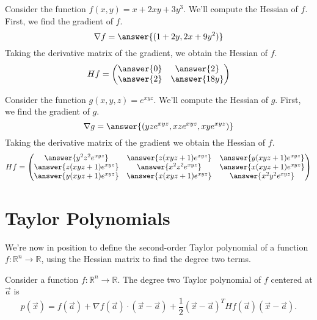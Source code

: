\documentclass{ximera}
\begin{document}
\begin{example}
Consider the function $f(x,y) = x + 2xy + 3y^3$. We'll compute the Hessian of $f$. First, we find the gradient of $f$.
\[
\nabla f = \answer{(1+2y, 2x+9y^2)}
\]
Taking the derivative matrix of the gradient, we obtain the Hessian of $f$.
\[
Hf = \begin{pmatrix}
\answer{0} & \answer{2}\\
\answer{2} & \answer{18y}
\end{pmatrix}
\]

Consider the function $g(x,y,z) = e^{xyz}$. We'll compute the Hessian of $g$. First, we find the gradient of $g$.
\[
\nabla g = \answer{(yze^{xyz}, xze^{xyz}, xye^{xyz})}
\]
Taking the derivative matrix of the gradient we obtain the Hessian of $f$.
\[
Hf = \begin{pmatrix}
\answer{y^2z^2e^{xyz}} & \answer{z(xyz+1)e^{xyz}} & \answer{y(xyz+1)e^{xyz}}\\
\answer{z(xyz+1)e^{xyz}} & \answer{x^2z^2e^{xyz}} & \answer{x(xyz+1)e^{xyz}}\\
\answer{y(xyz+1)e^{xyz}} & \answer{x(xyz+1)e^{xyz}} & \answer{x^2y^2e^{xyz}}
\end{pmatrix}
\]
\end{example}

\section*{Taylor Polynomials}

We're now in position to define the second-order Taylor polynomial of a function $f:\mathbb{R}^n\rightarrow \mathbb{R}$, using the Hessian matrix to find the degree two terms.

\begin{definition}
Consider a function $f:\mathbb{R}^n\rightarrow\mathbb{R}$. The degree two Taylor polynomial of $f$ centered at $\vec{a}$ is
\[
p(\vec{x}) = f(\vec{a}) + \nabla f(\vec{a})\cdot (\vec{x}-\vec{a}) + \frac{1}{2} (\vec{x}-\vec{a})^T Hf(\vec{a})(\vec{x}-\vec{a}).
\]
\end{definition}
\end{document}
